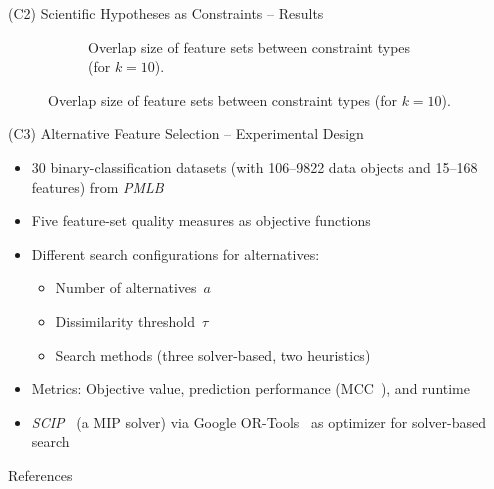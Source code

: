 \documentclass[en, navbarinline, handout]{sdqbeamer}
\begin{document}
\begin{frame}[t]{(C2) Scientific Hypotheses as Constraints -- Results}
\begin{figure}
\begin{subfigure}{0.48\textwidth}
			\caption*{Overlap size of feature sets between constraint types (for $k=10$).}
		\end{subfigure}
	\end{figure}
\end{frame}

\begin{frame}[t]{(C3) Alternative Feature Selection -- Experimental Design}
	\begin{itemize}
		\item 30 binary-classification datasets (with 106--9822 data objects and 15--168 features) from \emph{PMLB}~\cite{olson2017pmlb, romano2021pmlb}
		\item Five feature-set quality measures as objective functions
		\item Different search configurations for alternatives:
		\begin{itemize}
			\item Number of alternatives~$a$
			\item Dissimilarity threshold~$\tau$
			\item Search methods (three solver-based, two heuristics)
		\end{itemize}
		\item Metrics: Objective value, prediction performance (MCC~\cite{matthews1975comparison}), and runtime
		\item \emph{SCIP}~\cite{bestuzheva2021scip} (a MIP solver) via {Google OR-Tools}~\cite{perron2022or-tools} as optimizer for solver-based search
	\end{itemize}
\end{frame}

\begin{frame}[t, allowframebreaks]{References}
	\renewcommand*{\bibfont}{\small} %
	\printbibliography
\end{frame}

\backupend
\end{document}
